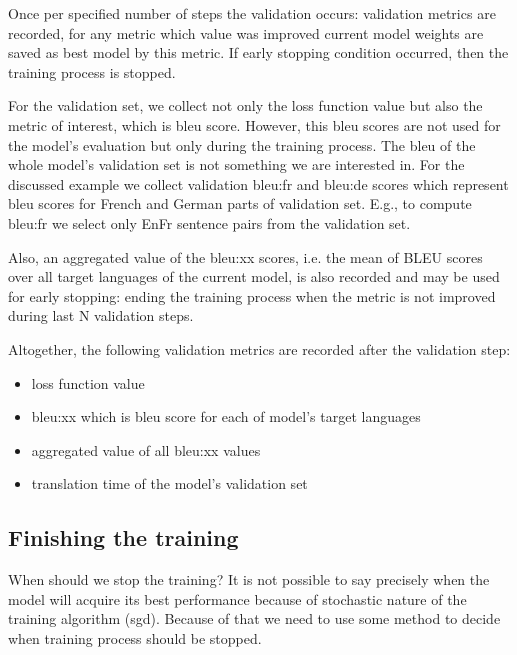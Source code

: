 Once per specified number of steps the validation occurs:
validation metrics are recorded, for any metric which value was
improved current model weights are saved as best model by this metric.
If early stopping condition occurred, then the training process is stopped.

For the validation set, we collect not only the loss function value
but also the metric of interest, which is \acrshort{bleu} score.
However, this \acrshort{bleu} scores are not used for the model's
evaluation but only during the training process.
The \acrshort{bleu} of the whole model's validation set
is not something we are interested in.
For the discussed example we collect validation bleu:fr and bleu:de scores
which represent \acrshort{bleu} scores for French and German
parts of validation set.
E.g., to compute bleu:fr we select only En\to{}Fr sentence pairs from the
validation set.

Also, an aggregated value of the bleu:xx scores, i.e. the mean of BLEU scores
over all target languages of the current model, is also recorded
and may be used for early stopping: ending the training process
when the metric is not improved during last N validation steps.

\begin{samepage}
Altogether, the following validation metrics are recorded after the
validation step:
\begin{itemize}
	\item loss function value
	\item bleu:xx which is \acrshort{bleu} score for each of
	model's target languages
	\item aggregated value of all bleu:xx values
	\item translation time of the model's validation set
\end{itemize}
\end{samepage}

\subsection{Finishing the training}
\label{section:finishing-the-training}

When should we stop the training?
It is not possible to say precisely when the model will acquire its best performance because of stochastic nature of
the training algorithm (\acrshort{sgd}).
Because of that we need to use some method to decide when
training process should be stopped.


